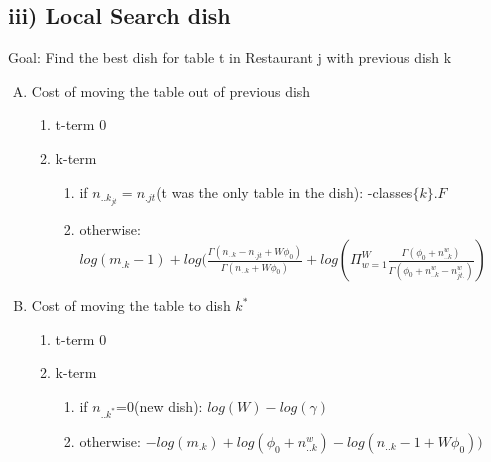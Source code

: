 \documentclass{article}
\begin{document}
\begin{spacing}{1.1}
\subsection{iii) Local Search dish}
Goal: Find the best dish for table t in Restaurant j with previous dish k
\begin{enumerate}[(A)]
\item Cost of moving the table out of previous dish
\begin{enumerate}
\item t-term 0
\item k-term
\begin{enumerate}
 \item if $n_{..k_{jt}}=n_{.jt}$(t was the only table in the dish): -classes$\{k\}.F$
 \item otherwise: $log(m_{.k}-1)+log(\frac{\Gamma(n_{..k}-n_{.jt}+W\phi_{0})}{\Gamma(n_{..k}+W\phi_{0})}+log(\Pi_{w=1}^{W}\frac{\Gamma(\phi_{0}+n_{..k}^{w})}{\Gamma(\phi_{0}+n_{..k}^{w}-n_{jt.}^{w})})$
\end{enumerate}
\end{enumerate}

\item Cost of moving the table to dish $k^{*}$
\begin{enumerate}
\item t-term 0
\item k-term
\begin{enumerate}
 \item if $n_{..k^{*}}$=0(new dish): $log(W)-log(\gamma)$
 \item otherwise: $-log(m_{.k})+log(\phi_{0}+n_{..k}^{w})-log(n_{..k}-1+W\phi_{0}))$
\end{enumerate}
\end{enumerate}

\end{enumerate}

\end{spacing}
\end{document}
